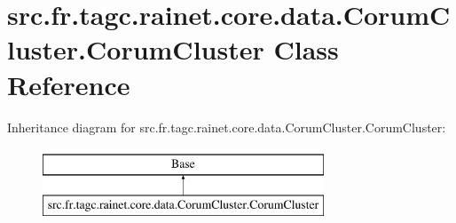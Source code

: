 \hypertarget{classsrc_1_1fr_1_1tagc_1_1rainet_1_1core_1_1data_1_1CorumCluster_1_1CorumCluster}{\section{src.\-fr.\-tagc.\-rainet.\-core.\-data.\-Corum\-Cluster.\-Corum\-Cluster Class Reference}
\label{classsrc_1_1fr_1_1tagc_1_1rainet_1_1core_1_1data_1_1CorumCluster_1_1CorumCluster}
}
Inheritance diagram for src.\-fr.\-tagc.\-rainet.\-core.\-data.\-Corum\-Cluster.\-Corum\-Cluster\-:\begin{figure}[H]
\begin{center}
\leavevmode
\includegraphics[height=2.000000cm]{classsrc_1_1fr_1_1tagc_1_1rainet_1_1core_1_1data_1_1CorumCluster_1_1CorumCluster}
\end{center}
\end{figure}

